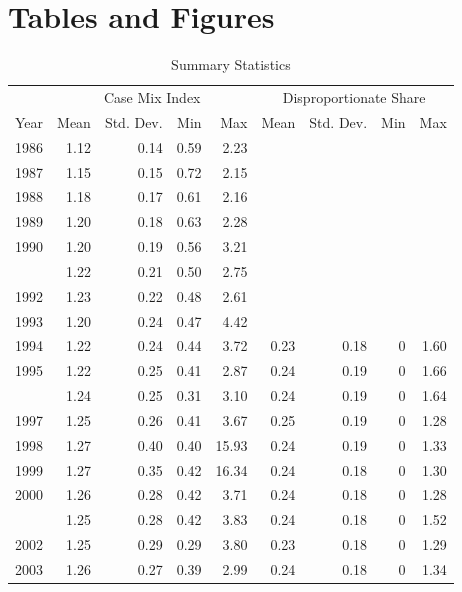 \documentclass[
  12pt,
]{article}
\begin{document}
\newpage
{}

\hypertarget{tables-and-figures}{%
\section{Tables and Figures}\label{tables-and-figures}}

\begin{table}[H]

\caption{\label{tab:sum-stats}Summary Statistics}
\centering
\begin{tabular}[t]{lrrrrrrrr}
\toprule
\multicolumn{1}{c}{ } & \multicolumn{4}{c}{Case Mix Index} & \multicolumn{4}{c}{Disproportionate Share} \\
\cmidrule(l{3pt}r{3pt}){2-5} \cmidrule(l{3pt}r{3pt}){6-9}
Year & Mean & Std. Dev. & Min & Max & Mean & Std. Dev. & Min & Max\\
\midrule
1986 & 1.12 & 0.14 & 0.59 & 2.23 &  &  &  & \\
1987 & 1.15 & 0.15 & 0.72 & 2.15 &  &  &  & \\
1988 & 1.18 & 0.17 & 0.61 & 2.16 &  &  &  & \\
1989 & 1.20 & 0.18 & 0.63 & 2.28 &  &  &  & \\
1990 & 1.20 & 0.19 & 0.56 & 3.21 &  &  &  & \\
\addlinespace
1991 & 1.22 & 0.21 & 0.50 & 2.75 &  &  &  & \\
1992 & 1.23 & 0.22 & 0.48 & 2.61 &  &  &  & \\
1993 & 1.20 & 0.24 & 0.47 & 4.42 &  &  &  & \\
1994 & 1.22 & 0.24 & 0.44 & 3.72 & 0.23 & 0.18 & 0 & 1.60\\
1995 & 1.22 & 0.25 & 0.41 & 2.87 & 0.24 & 0.19 & 0 & 1.66\\
\addlinespace
1996 & 1.24 & 0.25 & 0.31 & 3.10 & 0.24 & 0.19 & 0 & 1.64\\
1997 & 1.25 & 0.26 & 0.41 & 3.67 & 0.25 & 0.19 & 0 & 1.28\\
1998 & 1.27 & 0.40 & 0.40 & 15.93 & 0.24 & 0.19 & 0 & 1.33\\
1999 & 1.27 & 0.35 & 0.42 & 16.34 & 0.24 & 0.18 & 0 & 1.30\\
2000 & 1.26 & 0.28 & 0.42 & 3.71 & 0.24 & 0.18 & 0 & 1.28\\
\addlinespace
2001 & 1.25 & 0.28 & 0.42 & 3.83 & 0.24 & 0.18 & 0 & 1.52\\
2002 & 1.25 & 0.29 & 0.29 & 3.80 & 0.23 & 0.18 & 0 & 1.29\\
2003 & 1.26 & 0.27 & 0.39 & 2.99 & 0.24 & 0.18 & 0 & 1.34\\

\end{tabular}
\end{table}
\end{document}
